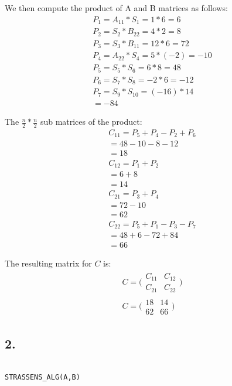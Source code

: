 \documentclass[11pt,letterpaper]{article}
\begin{document}
We then compute the product of A and B matrices as follows:
\begin{eqnarray}
	P_1 = A_{11} * S_1 = 1 * 6 = 6 \\
	P_2 = S_2 * B_{22} = 4 * 2 = 8 \\
	P_3 = S_3 * B_{11} = 12 * 6 = 72 \\
	P_4 = A_{22} * S_4 = 5 * (-2) = -10 \\
	P_5 = S_5 * S_6 = 6 * 8 = 48 \\
	P_6 = S_7 * S_8 = -2 * 6 = -12 \\
	P_7 = S_9 * S_{10} = (-16) * 14 \\
	= -84
\end{eqnarray}

The $ \frac{n}{2} * \frac{n}{2} $ sub matrices of the product:
\begin{eqnarray}
	C_{11} = P_5 + P_4 - P_2 + P_6 \\
	= 48 - 10 - 8 - 12 \\
	= 18 \\
	C_{12} = P_1 + P_2 \\
	= 6 + 8 \\
	= 14 \\
	C_{21} = P_3 + P_4 \\
	= 72 - 10 \\
	= 62 \\
	C_{22} = P_5 + P_1 - P_3 - P_7 \\
	= 48 + 6 - 72 + 84 \\
	= 66
\end{eqnarray}

The resulting matrix for $C$ is:
\begin{eqnarray}
	C = \bigl(
		\begin{smallmatrix}
		C_{11} & C_{12} \\
		C_{21} & C_{22}
		\end{smallmatrix} \bigr)
\\
	C = \bigl(
		\begin{smallmatrix}
		18 & 14 \\
		62 & 66
		\end{smallmatrix} \bigr)
\end{eqnarray}

\subsection*{2.}
\begin{lstlisting}
						
STRASSENS_ALG(A,B)
\end{lstlisting}
\end{document}
